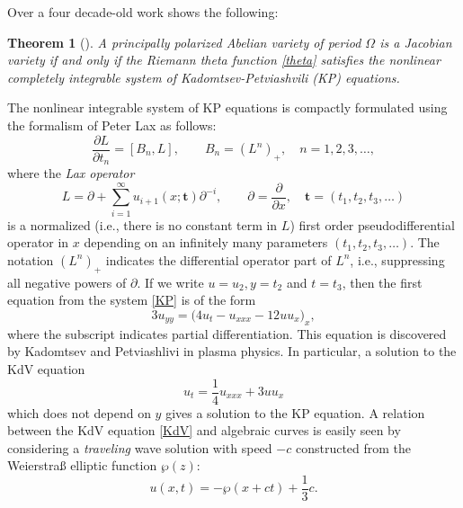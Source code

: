 \documentclass{amsart}
\newtheorem{thm}{Theorem}[section]
\theoremstyle{definition}
\numberwithin{equation}{section}
\numberwithin{figure}{section}
\newcommand{\be}{\begin{equation}}
\newcommand{\ee}{\end{equation}}
\begin{document}
Over a four decade-old work  \cite{M1984}
shows the following:

\begin{thm}[\cite{M1984}]
A principally polarized
Abelian variety of period $\Omega$ is a Jacobian variety if and only if
the Riemann theta function \eqref{theta} satisfies the 
nonlinear completely integrable system of Kadomtsev-Petviashvili (KP) equations.
\end{thm}

The nonlinear integrable system of KP equations is compactly  formulated 
using the formalism of Peter Lax as follows:
\be
\label{KP}
\frac{\partial L}{\partial t_n} = [B_n, L], \qquad B_n = (L^n)_+,\quad n=1, 2, 3, 
\dots,
\ee
where the \emph{Lax operator}
\be
\label{Lax}
L=\partial + \sum_{i=1}^\infty u_{i+1}(x; \mathbf{t})\partial^{-i}, \qquad 
\partial = \frac{\partial}{\partial x}, \quad \mathbf{t} = (t_1, t_2, t_3,\dots)
\ee
is a normalized (i.e., there is no constant term in $L$) 
first order pseudodifferential operator in $x$ 
depending on  an 
infinitely many parameters $(t_1, t_2, t_3,\dots)$. The notation $(L^n)_+$ indicates the
differential operator part of $L^n$, i.e., suppressing all 
negative powers of $\partial$. If we write $u = u_2, y = t_2$ and $t = t_3$, 
then the first equation from the system \eqref{KP} is of the form
$$
3u_{yy} = \big(4 u_t -u_{xxx}-12u u_x\big)_x,
$$
where the subscript indicates partial differentiation. This equation
is discovered by Kadomtsev and Petviashlivi in plasma physics. In particular,
a solution to the KdV equation
\be
\label{KdV}
u_t = \frac{1}{4} u_{xxx}+ 3u u_x
\ee
which does not depend on $y$ gives a solution to the KP equation.
A relation between the KdV equation \eqref{KdV} and 
algebraic curves is easily seen by considering a \emph{traveling}
wave solution with speed $-c$ constructed from the Weierstra\ss \;
elliptic function $\wp(z)$: 
\be
\label{p-solution}
u(x,t) = -\wp(x+ct) + \frac{1}{3} c.
\ee
\end{document}
